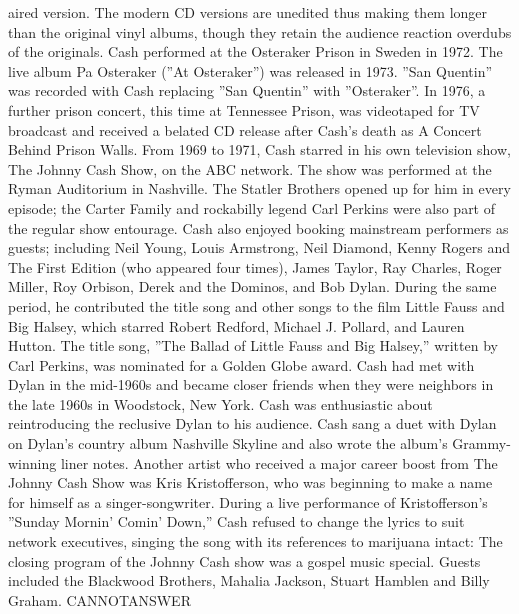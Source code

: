 \documentclass[11pt,a4paper, onecolumn]{article}
\begin{document}
aired version. The modern CD versions are unedited thus making them longer than the original vinyl albums, though they retain the audience reaction overdubs of the originals. Cash performed at the Osteraker Prison in Sweden in 1972. The live album Pa Osteraker (''At Osteraker'') was released in 1973. ''San Quentin'' was recorded with Cash replacing ''San Quentin'' with ''Osteraker''. In 1976, a further prison concert, this time at Tennessee Prison, was videotaped for TV broadcast and received a belated CD release after Cash's death as A Concert Behind Prison Walls. From 1969 to 1971, Cash starred in his own television show, The Johnny Cash Show, on the ABC network. The show was performed at the Ryman Auditorium in Nashville. The Statler Brothers opened up for him in every episode; the Carter Family and rockabilly legend Carl Perkins were also part of the regular show entourage. Cash also enjoyed booking mainstream performers as guests; including Neil Young, Louis Armstrong, Neil Diamond, Kenny Rogers and The First Edition (who appeared four times), James Taylor, Ray Charles, Roger Miller, Roy Orbison, Derek and the Dominos, and Bob Dylan. During the same period, he contributed the title song and other songs to the film Little Fauss and Big Halsey, which starred Robert Redford, Michael J. Pollard, and Lauren Hutton. The title song, ''The Ballad of Little Fauss and Big Halsey,'' written by Carl Perkins, was nominated for a Golden Globe award. Cash had met with Dylan in the mid-1960s and became closer friends when they were neighbors in the late 1960s in Woodstock, New York. Cash was enthusiastic about reintroducing the reclusive Dylan to his audience. Cash sang a duet with Dylan on Dylan's country album Nashville Skyline and also wrote the album's Grammy-winning liner notes. Another artist who received a major career boost from The Johnny Cash Show was Kris Kristofferson, who was beginning to make a name for himself as a singer-songwriter. During a live performance of Kristofferson's ''Sunday Mornin' Comin' Down,'' Cash refused to change the lyrics to suit network executives, singing the song with its references to marijuana intact: The closing program of the Johnny Cash show was a gospel music special. Guests included the Blackwood Brothers, Mahalia Jackson, Stuart Hamblen and Billy Graham. CANNOTANSWER
\end{document}

